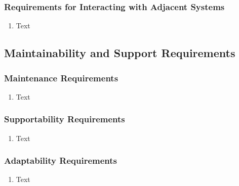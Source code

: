 \documentclass [11pt]{article}
\begin{document}
\subsubsection{Requirements for Interacting with Adjacent Systems}
	\begin{enumerate}[label=\textbf{(\roman*)}]
		\item Text
	\end{enumerate}

\subsection{Maintainability and Support Requirements }

\subsubsection{Maintenance Requirements }
	\begin{enumerate}[label=\textbf{(\roman*)}]
		\item Text
	\end{enumerate}

\subsubsection{Supportability Requirements }
	\begin{enumerate}[label=\textbf{(\roman*)}]
		\item Text
	\end{enumerate}

\subsubsection{Adaptability Requirements}
	\begin{enumerate}[label=\textbf{(\roman*)}]
		\item Text
	\end{enumerate}

\end{document}
